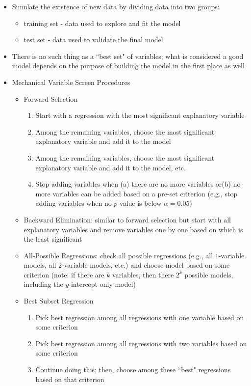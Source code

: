 \documentclass[12pt]{article}
\begin{document}
\begin{itemize}
\item Simulate the existence of new data by dividing data into two groups: \begin{itemize} 
\item training set - data used to explore and fit the model
\item test set - data used to validate the final model \end{itemize} 
\item There is no such thing as a ``best set" of variables; what is considered a good model depends on the purpose of building the model in the first place as well 
\item Mechanical Variable Screen Procedures \begin{itemize} 
\item Forward Selection \begin{enumerate} 
\item Start with a regression with the most significant explanatory variable
\item Among the remaining variables, choose the most significant explanatory variable and add it to the model
\item Among the remaining variables, choose the most significant explanatory variable and add it to the model, etc.
\item Stop adding variables when (a) there are no more variables or(b) no more variables can be added based on a pre-set criterion (e.g., stop adding variables when no $p$-value is below $\alpha = 0.05$) \end{enumerate}
\item Backward Elimination: similar to forward selection but start with all explanatory variables and remove variables one by one based on which is the least significant
\item All-Possible Regressions: check all possible regressions (e.g., all $1$-variable models, all $2$-variable models, etc.) and choose model based on some criterion (note: if there are $k$ variables, then there $2^k$ possible models, including the $y$-intercept only model) 
\item Best Subset Regression \begin{enumerate} 
\item Pick best regression among all regressions with one variable based on some criterion 
\item Pick best regression among all regressions with two variables based on some criterion 
\item Continue doing this; then, choose among these ``best" regressions based on that criterion \end{enumerate} \end{itemize} 

\end{itemize}
\end{document}
